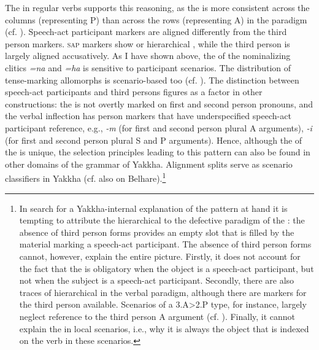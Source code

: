 The   in regular verbs supports this reasoning, as the  is more consistent across the columns (representing P) than across the rows (representing A) in the paradigm (cf. \citealt{Schackow2012_Grammatical}). Speech-act participant markers are aligned differently from the third person markers. \textsc{sap} markers show  or hierarchical , while the third person is largely aligned accusatively. As I have shown above, the  of the nominalizing clitics \emph{=na} and \emph{=ha} is sensitive to participant scenarios.  The distribution of tense-marking allomorphs is scenario-based too (cf. ).  The distinction between speech-act participants and third persons figures as a factor in other constructions: the   is not overtly marked on first and second person pronouns, and the verbal inflection has person markers that have underspecified speech-act participant reference, e.g., \emph{-m} (for first and second person plural A arguments), \emph{-i} (for first and second person plural S and P arguments). Hence, although the  of the  is unique, the selection principles leading to this pattern can also be found in other domains of the grammar of Yakkha. Alignment splits serve as scenario classifiers in Yakkha (cf. also \citealt{Bickel1992Motivation} on Belhare).\footnote{In search for a  Yakkha-internal explanation of the pattern at hand it is tempting to attribute the hierarchical  to the defective paradigm of the : the absence of third person forms provides an empty slot that is filled by the material marking a speech-act participant. The absence of third person forms cannot, however, explain the entire picture.  Firstly, it does not account for the fact that the  is obligatory when the object is a speech-act participant, but not when the subject is a speech-act participant. Secondly, there are also traces of hierarchical  in the verbal paradigm, although there are markers for the third person available. Scenarios of a 3.A>2.P type, for instance, largely neglect reference to the third person A argument (cf. ). Finally, it cannot explain the   in local scenarios, i.e., why it is always the object that is indexed on the verb in these scenarios.}


